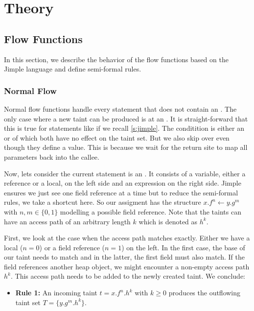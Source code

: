 \documentclass[../draft.tex]{subfiles}
\begin{document}
    \chapter{Theory}
    \section{Flow Functions}
    In this section, we describe the behavior of the flow functions based on the Jimple language and define semi-formal rules.

    \subsection{Normal Flow}\label{s:normalflow}
    Normal flow functions handle every statement that does not contain an . The only case where a new taint can be produced is at an . It is straight-forward that this is true for statements like  if we recall \autoref{s:jimple}. The conditition is either an  or  of which both have no effect on the taint set. But we also skip over  even though they define a value. This is because we wait for the return site to map all parameters back into the callee.

    Now, lets consider the current statement is an . It consists of a variable, either a reference or a local, on the left side and an expression on the right side. Jimple ensures we just see one field reference at a time but to reduce the semi-formal rules, we take a shortcut here. So our assigment has the structure $x.f^n \leftarrow y.g^m$ with $n,m \in \{0,1\}$ modelling a possible field reference. Note that the taints can have an access path of an arbitrary length $k$ which is denoted as $h^k$.

    First, we look at the case when the access path matches exactly. Either we have a local ($n=0$) or a field reference ($n=1$) on the left. In the first case, the base of our taint needs to match and in the latter, the first field must also match. If the field references another heap object, we might encounter a non-empty access path $h^k$. This access path needs to be added to the newly created taint. We conclude:
    \begin{itemize}
        \item[] \textbf{Rule 1:} An incoming taint $t = x.f^n.h^k$ with $k \geq 0$ produces the outflowing taint set $T = \{y.g^m.h^k\}$.
    \end{itemize} 
\end{document}
